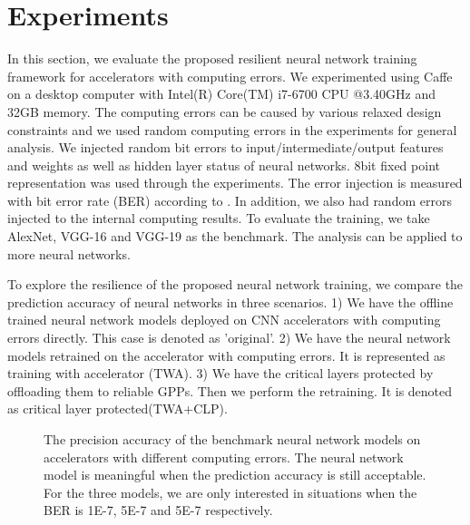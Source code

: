 \section{Experiments} \label{sec:casestudy}
In this section, we evaluate the proposed resilient neural network training 
framework for accelerators with computing errors. 
We experimented using Caffe on a desktop computer 
with Intel(R) Core(TM) i7-6700 CPU @3.40GHz and 32GB memory.
The computing errors can be caused by various relaxed design 
constraints and we used random computing 
errors in the experiments for general analysis.
We injected random bit errors to input/intermediate/output features and weights as well as 
hidden layer status of neural networks. 8bit fixed point representation was used
through the experiments. The error injection is measured with 
bit error rate (BER) according to \cite{B2018ARES}. In addition,
we also had random errors injected to the internal computing results. 
To evaluate the training, we take AlexNet, VGG-16 and VGG-19 as the benchmark. 
The analysis can be applied to more neural networks.

To explore the resilience of the proposed neural network training, we
compare the prediction accuracy of neural networks in three scenarios.
1) We have the offline trained neural network models deployed on 
CNN accelerators with computing errors directly. This case is denoted 
as 'original'. 2) We have the neural network models retrained on the 
accelerator with computing errors. It is represented as training with 
accelerator (TWA). 3) We have the critical layers 
protected by offloading them to reliable GPPs. Then we 
perform the retraining. It is denoted as critical layer protected(TWA+CLP).

\begin{figure}[t]
        \center
        \qquad
        \qquad
        \caption{The precision accuracy of the benchmark neural network models on accelerators with different computing errors. 
		The neural network model is meaningful when the prediction accuracy is still acceptable. For the three models, 
	we are only interested in situations when the BER is 1E-7, 5E-7 and 5E-7 respectively.}
        \label{fig:softerror-accuracy}
       \vspace{-1em}
\end{figure}

